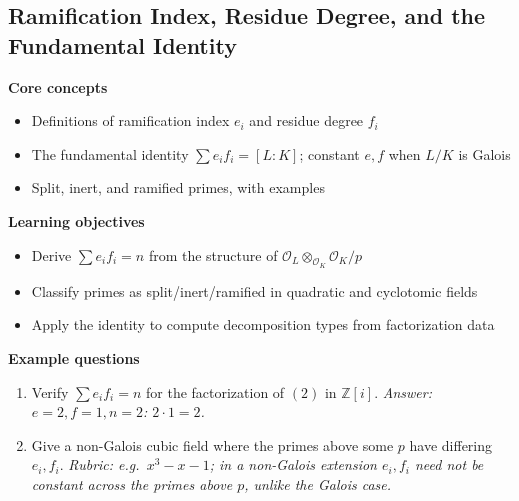 \documentclass[11pt]{article}
\newcommand{\Z}{\mathbb{Z}}
\newcommand{\OK}{\mathcal{O}_K}
\newcommand{\OL}{\mathcal{O}_L}
\begin{document}
\subsection{Ramification Index, Residue Degree, and the Fundamental Identity}
\textbf{Core concepts}
\begin{itemize}[noitemsep]
  \item Definitions of ramification index $e_i$ and residue degree $f_i$
  \item The fundamental identity $\sum e_i f_i = [L:K]$; constant $e,f$ when $L/K$ is Galois
  \item Split, inert, and ramified primes, with examples
\end{itemize}
\textbf{Learning objectives}
\begin{itemize}[noitemsep]
  \item Derive $\sum e_i f_i = n$ from the structure of $\OL \otimes_{\OK} \OK/p$
  \item Classify primes as split/inert/ramified in quadratic and cyclotomic fields
  \item Apply the identity to compute decomposition types from factorization data
\end{itemize}
\textbf{Example questions}
\begin{enumerate}[noitemsep]
  \item[Q1 (foundational).] Verify $\sum e_if_i = n$ for the factorization of $(2)$ in $\Z[i]$. \emph{Answer: $e=2, f=1, n=2$: $2\cdot 1 = 2$. \checkmark}
  \item[Q2 (advanced).] Give a non-Galois cubic field where the primes above some $p$ have differing $e_i,f_i$. \emph{Rubric: e.g.\ $x^3-x-1$; in a non-Galois extension $e_i,f_i$ need not be constant across the primes above $p$, unlike the Galois case.}
\end{enumerate}

\end{document}

